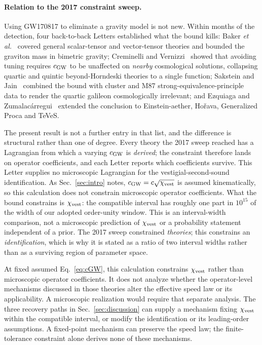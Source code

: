 \documentclass[aps,prl,reprint,nofootinbib,superscriptaddress]{revtex4-2}
\newcommand{\cGW}{c_{\rm GW}}
\newcommand{\chivest}{\chi_{\rm vest}}
\begin{document}
\paragraph{Relation to the 2017 constraint sweep.} Using GW170817 to
eliminate a gravity model is not new. Within months of the detection,
four back-to-back Letters established what the bound
kills: Baker \emph{et al.}~\cite{BakerBellini2017} covered general
scalar-tensor and vector-tensor theories and bounded the graviton mass
in bimetric gravity; Creminelli and
Vernizzi~\cite{CreminelliVernizzi2017} showed that avoiding tuning
requires $\cGW$ to be unaffected on \emph{nearby} cosmological
solutions, collapsing quartic and quintic beyond-Horndeski theories to a
single function; Sakstein and Jain~\cite{SaksteinJain2017} combined the
bound with cluster and M87 strong-equivalence-principle data to render
the quartic galileon cosmologically irrelevant; and Ezquiaga and
Zumalac\'arregui~\cite{EzquiagaZumalacarregui2017} extended the
conclusion to Einstein-aether, Ho\v{r}ava, Generalized Proca and TeVeS.

The present result is not a further entry in that list, and the
difference is structural rather than one of degree. Every theory the
2017 sweep reached has a Lagrangian from which a varying $\cGW$ is
\emph{derived}; the constraint therefore lands on operator coefficients,
and each Letter reports which coefficients survive. This Letter supplies no microscopic Lagrangian for the
vestigial-second-sound identification. As Sec.~\ref{sec:intro} notes,
$\cGW = c\sqrt{\chivest}$ is assumed kinematically, so this calculation
does not constrain microscopic operator coefficients.
What the bound constrains is $\chivest$: the compatible interval has
roughly one part in $10^{15}$ of the width of our adopted order-unity
window. This is an interval-width comparison, not a microscopic
prediction of $\chivest$ or a probability statement independent of a prior. The
2017 sweep constrained \emph{theories}; this constrains an
\emph{identification}, which is why it is stated as a ratio of two
interval widths rather than as a surviving region of parameter space.

At fixed assumed Eq.~\eqref{eq:cGW}, this calculation constrains
$\chivest$ rather than microscopic operator coefficients. It does not
analyze whether the operator-level mechanisms discussed in those
theories alter the effective speed law or its applicability. A
microscopic realization would require that separate analysis.
The three recovery paths in
Sec.~\ref{sec:discussion} can supply a mechanism fixing $\chivest$
within the compatible interval, or modify the identification or its
leading-order assumptions. A fixed-point mechanism can preserve the
speed law; the finite-tolerance constraint alone derives none of
these mechanisms.
\end{document}
